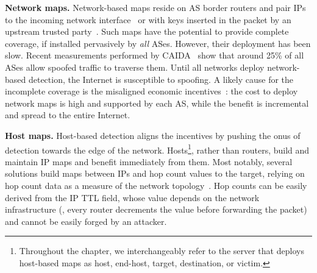 \textbf{Network maps.}
Network-based maps reside on AS border routers and pair IPs to the incoming network interface~\citep{rpf,idpf} or with keys inserted in the packet by an upstream trusted party~\citep{spm}. Such maps have the potential to provide complete coverage, if installed pervasively by {\em all} ASes. However, their deployment has been slow. Recent measurements performed by CAIDA~\citep{spoofing-state} show that around 25\% of all ASes allow spoofed traffic to traverse them. Until all networks deploy network-based detection, the Internet is susceptible to spoofing.
%
A likely cause for the incomplete coverage is the misaligned economic incentives~\citep{pam17-loops}: the cost to deploy network maps is high and supported by each AS, while the benefit is incremental and spread to the entire Internet.


%



\textbf{Host maps.}
Host-based detection aligns the incentives by pushing the onus of detection towards the edge of the network. Hosts\footnote{Throughout the chapter, we interchangeably refer to the server that deploys host-based maps as host, end-host, target, destination, or victim.}, rather than routers, build and maintain IP maps and benefit immediately from them. Most notably, several solutions build maps between IPs and hop count values to the target, relying on hop count data as a measure of the network topology~\citep{iphc,hcf}. 
Hop counts can be easily derived from the IP TTL field, whose value depends on the network infrastructure (\ie{}, every router decrements the value before forwarding the packet) and cannot be easily forged by an attacker.  

